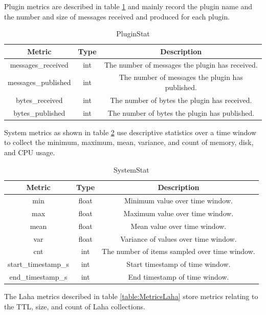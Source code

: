 Plugin metrics are described in table \ref{table:MetricsPluginStat} and mainly record the plugin name and the number and size of messages received and produced for each plugin.

\begin{table}[H]
	\centering
	\caption{PluginStat}
	\begin{tabular}{|c|c|c|}
		\hline 
		Metric & Type & Description \\ 
		\hline
		messages\_received & int & The number of messages the plugin has received. \\
		\hline
		messages\_published & int & The number of messages the plugin has published. \\
		\hline
		bytes\_received & int & The number of bytes the plugin has received. \\
		\hline
		bytes\_published & int & The number of bytes the plugin has published. \\
		\hline
	\end{tabular} 
	\label{table:MetricsPluginStat}
\end{table}

System metrics as shown in table \ref{table:MetricsSystemStat} use descriptive statistics over a time window to collect the minimum, maximum, mean, variance, and count of memory, disk, and CPU usage.

\begin{table}[H]
	\centering
	\caption{SystemStat}
	\begin{tabular}{|c|c|c|}
		\hline 
		Metric & Type & Description \\ 
		\hline
		min & float & Minimum value over time window. \\
		\hline
		max & float & Maximum value over time window. \\
		\hline
		mean & float & Mean value over time window. \\
		\hline
		var & float & Variance of values over time window. \\
		\hline
		cnt & int & The number of items sampled over time window. \\
		\hline
		start\_timestamp\_s & int & Start timestamp of time window. \\
		\hline
		end\_timestamp\_s & int & End timestamp of time window. \\
		\hline
	\end{tabular} 
	\label{table:MetricsSystemStat}
\end{table}

The Laha metrics described in table \ref{table:MetricsLaha} store metrics relating to the TTL, size, and count of Laha collections.

